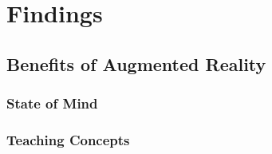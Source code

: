 \section*{Findings}
\subsection{Benefits of Augmented Reality}
\subsubsection{State of Mind}
\subsubsection{Teaching Concepts}